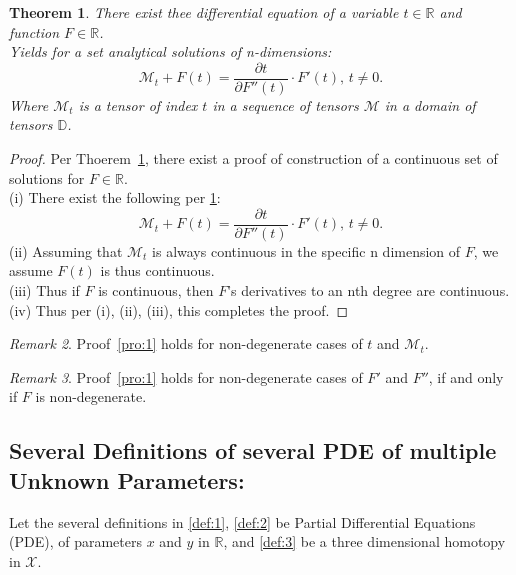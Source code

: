 \documentclass[10pt]{article}
\theoremstyle{plain}
\newtheorem{theorem}{Theorem}[section]
\theoremstyle{definition}
\theoremstyle{remark}
\newtheorem{remark}[theorem]{Remark}
\begin{document}
\begin{theorem}
\label{theo:1}
There exist thee differential equation of a variable $t \in \mathbb{R}$ and function $F \in \mathbb{R}$.\\
Yields for a set analytical solutions of n-dimensions:
\begin{equation}
	\mathcal{M}_{t} + F(t) = \frac{\partial t}{\partial F''(t)} \cdot F'(t), \, t \neq 0.
\end{equation}
Where $\mathcal{M}_{t}$ is a tensor of index $t$ in a sequence of tensors $\mathcal{M}$ in a domain of tensors $\mathbb{D}$.
\end{theorem}
\begin{proof}
\label{pro:1}
Per Thoerem~\ref{theo:1}, there exist a proof of construction of a continuous set of solutions for $F \in \mathbb{R}$.\\
(i) There exist the following per \ref{theo:1}:
\begin{equation}
	\mathcal{M}_{t} + F(t) = \frac{\partial t}{\partial F''(t)} \cdot F'(t), \, t \neq 0.
\end{equation}
(ii) Assuming that $\mathcal{M}_t$ is always continuous in the specific n dimension of $F$, we assume $F(t)$ is thus continuous.\\
(iii) Thus if $F$ is continuous, then $F$'s derivatives to an nth degree are continuous.\\
(iv) Thus per (i), (ii), (iii), this completes the proof.
\end{proof}
\begin{remark}
Proof~\ref{pro:1} holds for non-degenerate cases of $t$ and $\mathcal{M}_{t}$.
\end{remark}
\begin{remark}
Proof~\ref{pro:1} holds for non-degenerate cases of $F'$ and $F''$, if and only if $F$ is non-degenerate.
\end{remark}

\subsection{Several Definitions of several PDE of multiple Unknown Parameters:}

Let the several definitions in \ref{def:1}, \ref{def:2} be Partial Differential Equations (PDE), of parameters $x$ and $y$ in $\mathbb{R}$, and \ref{def:3} be a three dimensional homotopy in $\mathcal{X}$.
\end{document}
